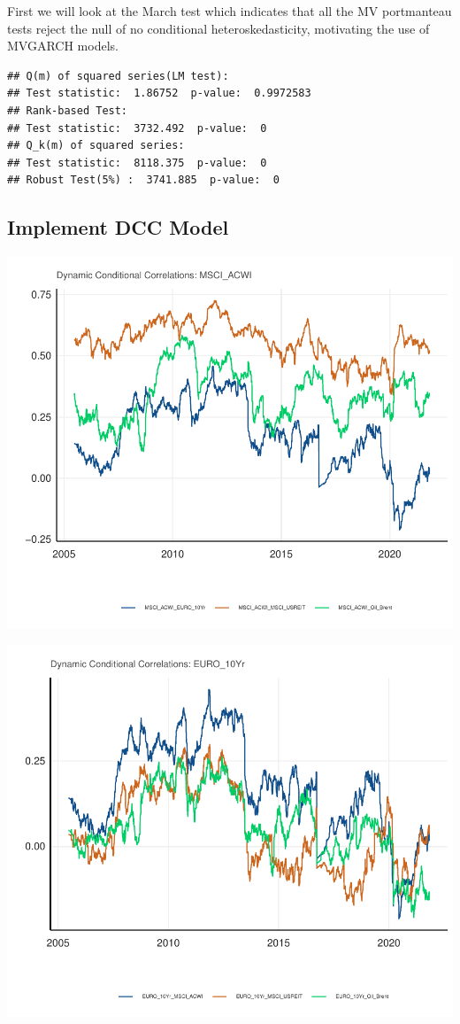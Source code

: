 \documentclass[11pt,preprint, authoryear]{elsarticle}
\numberwithin{equation}{section}
\numberwithin{figure}{section}
\numberwithin{table}{section}
\begin{document}
First we will look at the March test which indicates that all the MV
portmanteau tests reject the null of no conditional heteroskedasticity,
motivating the use of MVGARCH models.

\begin{verbatim}
## Q(m) of squared series(LM test):  
## Test statistic:  1.86752  p-value:  0.9972583 
## Rank-based Test:  
## Test statistic:  3732.492  p-value:  0 
## Q_k(m) of squared series:  
## Test statistic:  8118.375  p-value:  0 
## Robust Test(5%) :  3741.885  p-value:  0
\end{verbatim}

\hypertarget{implement-dcc-model}{%
\subsection{Implement DCC Model}\label{implement-dcc-model}}

\includegraphics{Question6_files/figure-latex/unnamed-chunk-7-1.pdf}

\includegraphics{Question6_files/figure-latex/unnamed-chunk-8-1.pdf}
\end{document}
